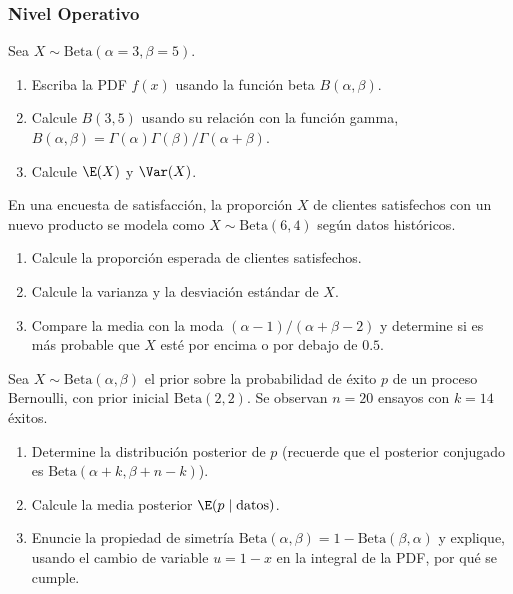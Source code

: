 \subsubsection*{Nivel Operativo}

\begin{problema}
	\label{prob:4.7.4}
	Sea $X \sim \text{Beta}(\alpha=3, \beta=5)$.
	\begin{enumerate}
		\item Escriba la PDF $f(x)$ usando la función beta $B(\alpha,\beta)$.
		\item Calcule $B(3,5)$ usando su relación con la función gamma, $B(\alpha,\beta) = \Gamma(\alpha)\Gamma(\beta)/\Gamma(\alpha+\beta)$.
		\item Calcule $\E(X)$ y $\Var(X)$.
	\end{enumerate}
\end{problema}

\begin{problema}
	\label{prob:4.7.5}
	En una encuesta de satisfacción, la proporción $X$ de clientes satisfechos con un nuevo producto se modela como $X \sim \text{Beta}(6,4)$ según datos históricos.
	\begin{enumerate}
		\item Calcule la proporción esperada de clientes satisfechos.
		\item Calcule la varianza y la desviación estándar de $X$.
		\item Compare la media con la moda $(\alpha-1)/(\alpha+\beta-2)$ y determine si es más probable que $X$ esté por encima o por debajo de $0.5$.
	\end{enumerate}
\end{problema}

\begin{problema}
	\label{prob:4.7.6}
	Sea $X \sim \text{Beta}(\alpha,\beta)$ el prior sobre la probabilidad de éxito $p$ de un proceso Bernoulli, con prior inicial $\text{Beta}(2,2)$. Se observan $n=20$ ensayos con $k=14$ éxitos.
	\begin{enumerate}
		\item Determine la distribución posterior de $p$ (recuerde que el posterior conjugado es $\text{Beta}(\alpha+k, \beta+n-k)$).
		\item Calcule la media posterior $\E(p \mid \text{datos})$.
		\item Enuncie la propiedad de simetría $\text{Beta}(\alpha,\beta) = 1 - \text{Beta}(\beta,\alpha)$ y explique, usando el cambio de variable $u = 1-x$ en la integral de la PDF, por qué se cumple.
	\end{enumerate}
\end{problema}

